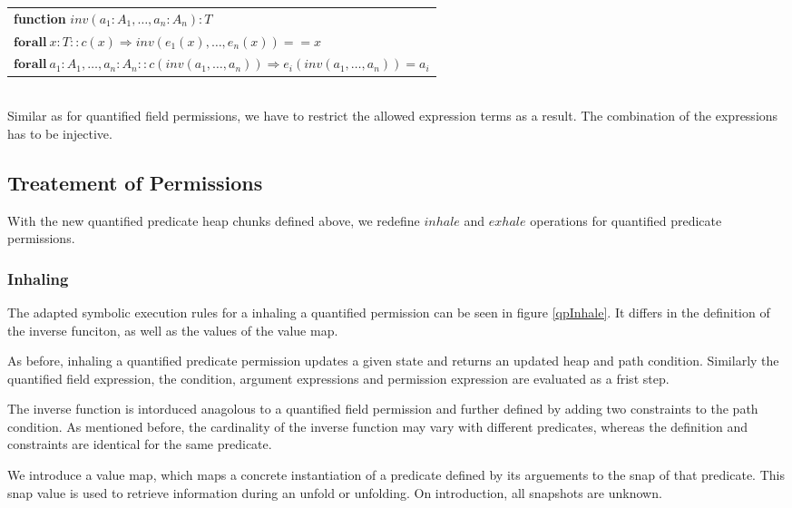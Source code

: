 \documentclass[12pt]{article}
\begin{document}
\begin{tabularx}{1\textwidth}{ X}
\textbf{function }\(inv(a_1:A_1, \dots, a_n:A_n): T\) \\
\( \mathbf{forall \ }  x:T :: c(x) \Rightarrow inv(e_1 (x),…,e_n (x))==x \) \\
\( \mathbf{forall \ }  a_1:A_1,\dots, a_n:A_n ::  c(inv(a_1, …,a_n )) \Rightarrow e_i (inv(a_1,\dots, a_n )) = a_i \) \\
\end{tabularx}\\

Similar as for quantified field permissions, we have to restrict the allowed expression terms as a result. The combination of the expressions has to be injective.

\subsection{Treatement of Permissions} \label{qpp}
With the new quantified predicate heap chunks defined above, we redefine \(inhale\) and \(exhale\) operations for quantified predicate permissions.

\subsubsection{Inhaling}
The adapted symbolic execution rules for a inhaling a quantified permission can be seen in figure \ref{qpInhale}. It differs in the definition of the inverse funciton, as well as the values of the value map.

As before, inhaling a quantified predicate permission updates a given state and returns an updated heap and path condition.
Similarly the quantified field expression, the condition, argument expressions and permission expression are evaluated as a frist step.

The inverse function is intorduced anagolous to a quantified field permission and further defined by adding two constraints to the path condition. As mentioned before, the cardinality of the inverse function may vary with different predicates, whereas the definition and constraints are identical for the same predicate.

We introduce a value map, which maps a concrete instantiation of a predicate defined by its arguements to the snap of that predicate. This snap value is used to retrieve information during an unfold or unfolding. On introduction, all snapshots are unknown.
\end{document}
